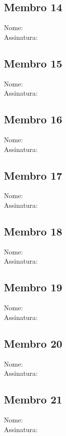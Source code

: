 \documentclass[12pt]{article}
\begin{document}
\newpage
\subsection{Membro 14}
Nome: \\
Assinatura: \underline{\hspace{5cm}}

\newpage
\subsection{Membro 15}
Nome: \\
Assinatura: \underline{\hspace{5cm}}

\newpage
\subsection{Membro 16}
Nome: \\
Assinatura: \underline{\hspace{5cm}}

\newpage
\subsection{Membro 17}
Nome: \\
Assinatura: \underline{\hspace{5cm}}

\newpage
\subsection{Membro 18}
Nome: \\
Assinatura: \underline{\hspace{5cm}}

\newpage
\subsection{Membro 19}
Nome: \\
Assinatura: \underline{\hspace{5cm}}

\newpage
\subsection{Membro 20}
Nome: \\
Assinatura: \underline{\hspace{5cm}}

\newpage
\subsection{Membro 21}
Nome: \\
Assinatura: \underline{\hspace{5cm}}
\end{document}
